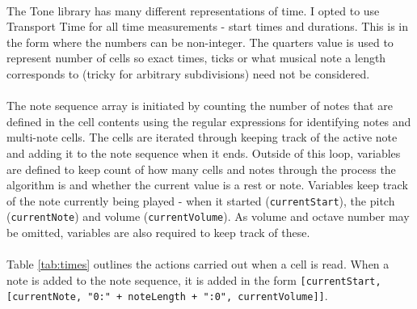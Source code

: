 \paragraph{} The Tone library has many different representations of time. I opted to use Transport Time for all time measurements - start times and durations. This is in the form \texttt{} where the numbers can be non-integer. The quarters value is used to represent number of cells so exact times, ticks or what musical note a length corresponds to (tricky for arbitrary subdivisions) need not be considered.

\paragraph{} The note sequence array is initiated by counting the number of notes that are defined in the cell contents using the regular expressions for identifying notes and multi-note cells. The cells are iterated through keeping track of the active note and adding it to the note sequence when it ends. Outside of this loop, variables are defined to keep count of how many cells and notes through the process the algorithm is and whether the current value is a rest or note. Variables keep track of the note currently being played - when it started (\texttt{currentStart}), the pitch (\texttt{currentNote}) and volume (\texttt{currentVolume}). As volume and octave number may be omitted, variables are also required to keep track of these. \paragraph{} Table \ref{tab:times} outlines the actions carried out when a cell is read. When a note is added to the note sequence, it is added in the form \texttt{[currentStart, [currentNote, "0:" + noteLength + ":0", currentVolume]]}.

